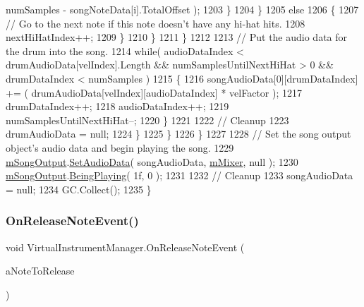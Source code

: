 \begin{DoxyCode}
      numSamples - songNoteData[i].TotalOffset );
1203                                 \}
1204                             \}
1205                             \textcolor{keywordflow}{else}
1206                             \{
1207                                 \textcolor{comment}{// Go to the next note if this note doesn't have any hi-hat hits.}
1208                                 nextHiHatIndex++;
1209                             \}
1210                         \}
1211                     \}
1212 
1213                     \textcolor{comment}{// Put the audio data for the drum into the song.}
1214                     \textcolor{keywordflow}{while}( audioDataIndex < drumAudioData[velIndex].Length && numSamplesUntilNextHiHat > 0 
      && drumDataIndex < numSamples )
1215                     \{
1216                         songAudioData[0][drumDataIndex] += ( drumAudioData[velIndex][audioDataIndex] * 
      velFactor );
1217                         drumDataIndex++;
1218                         audioDataIndex++;
1219                         numSamplesUntilNextHiHat--;
1220                     \}
1221 
1222                     \textcolor{comment}{// Cleanup}
1223                     drumAudioData = null;
1224                 \}
1225             \}
1226         \}
1227 
1228         \textcolor{comment}{// Set the song output object's audio data and begin playing the song.}
1229         \hyperlink{group___v_i_m_priv_gaa8d4f5642f5ac4dca4f4178b0052c78d}{mSongOutput}.\hyperlink{group___n_o_o_pub_func_gaef9ab691f0a2671a62249d853f24162d}{SetAudioData}( songAudioData, \hyperlink{group___v_i_m_priv_ga08c8db1bb89f4ab1e28451dd93d6b99c}{mMixer}, null );
1230         \hyperlink{group___v_i_m_priv_gaa8d4f5642f5ac4dca4f4178b0052c78d}{mSongOutput}.\hyperlink{group___n_o_o_pub_func_ga2bdaa2787408f353f71ef6c6a18e9285}{BeingPlaying}( 1f, 0 );
1231 
1232         \textcolor{comment}{// Cleanup}
1233         songAudioData = null;
1234         GC.Collect();
1235     \}
\end{DoxyCode}
\mbox{\label{group___v_i_m_handlers_ga0f0a34c251d154131f9ea130a54dc989}} 
\subsubsection{\texorpdfstring{On\+Release\+Note\+Event()}{OnReleaseNoteEvent()}}
{\footnotesize\ttfamily void Virtual\+Instrument\+Manager.\+On\+Release\+Note\+Event (\begin{DoxyParamCaption}\item[{\hyperlink{group___music_enums_ga508f69b199ea518f935486c990edac1d}{Music.\+P\+I\+T\+CH}}]{a\+Note\+To\+Release }\end{DoxyParamCaption})}



